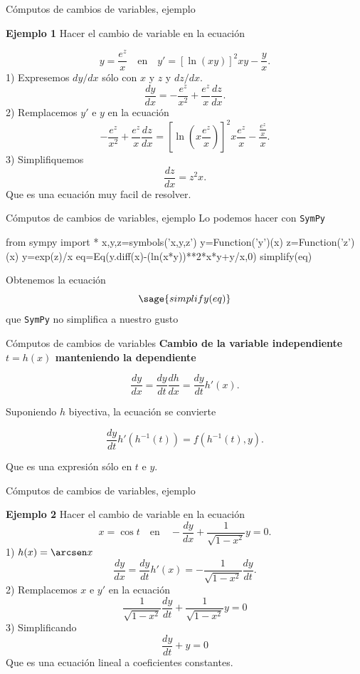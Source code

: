 \documentclass[handout,hyperref={colorlinks=true}]{beamer}
\begin{document}
\begin{frame}{Cómputos de cambios de variables, ejemplo}

\textbf{Ejemplo 1} Hacer el cambio de variable en la  ecuación 

\[y=\frac{e^z}{x}\quad\text{en}\quad  y'=\left[\ln(xy)\right]^2xy-\frac{y}{x}.\]
1) Expresemos $dy/dx$ sólo con $x$ y $z$ y $dz/dx$.
\[\frac{dy}{dx}=-\frac{e^z}{x^2}+\frac{e^z}{x}\frac{dz}{dx}.\]
2) Remplacemos $y'$ e $y$ en la ecuación 
\[-\frac{e^z}{x^2}+\frac{e^z}{x}\frac{dz}{dx}=\left[\ln\left(x \frac{e^z}{x} \right)\right]^2x\frac{e^z}{x}-\frac{\frac{e^z}{x} }{x}.\]
3) Simplifiquemos
\[\frac{dz}{dx}=z^2x.\]
Que es una ecuación muy facil de resolver.


\end{frame}










\begin{frame}[fragile]{Cómputos de cambios de variables, ejemplo}
Lo podemos hacer con \texttt{SymPy}

\begin{sageblock}
from sympy import *
x,y,z=symbols('x,y,z')
y=Function('y')(x)
z=Function('z')(x)
y=exp(z)/x
eq=Eq(y.diff(x)-(ln(x*y))**2*x*y+y/x,0)
simplify(eq)
\end{sageblock}
Obtenemos la ecuación
\[\sage{simplify(eq)}\]
que \texttt{SymPy} no simplifica a nuestro gusto
\end{frame}



\begin{frame}{Cómputos de cambios de variables}
\textbf{Cambio de la variable independiente $t=h(x)$ manteniendo la dependiente} 

\[\frac{dy}{dx}=\frac{dy}{dt}\frac{dh}{dx}=\frac{dy}{dt}h'(x).\]

Suponiendo $h$ biyectiva, la ecuación se convierte

\[\frac{dy}{dt}h'(h^{-1}(t))=f(h^{-1}(t),y).\]

Que es una expresión sólo en $t$ e $y$. 



\end{frame}

\begin{frame}{Cómputos de cambios de variables, ejemplo}

\textbf{Ejemplo 2} Hacer el cambio de variable en la  ecuación 
\[x=\cos t\quad\text{en}\quad  -\frac{dy}{dx}+\frac{1}{\sqrt{1-x^2}}y=0.\]
1) $h(x)=\arcsen x$
\[\frac{dy}{dx}=\frac{dy}{dt}h'(x)=-\frac{1}{\sqrt{1-x^2}}\frac{dy}{dt}.\]
2) Remplacemos $x$ e $y'$ en la ecuación 
\[\frac{1}{\sqrt{1-x^2}}\frac{dy}{dt}+ \frac{1}{\sqrt{1-x^2}}y=0\]
3) Simplificando
\[\frac{dy}{dt}+ y=0\]
Que es una ecuación lineal a coeficientes constantes.


\end{frame}
\end{document}
